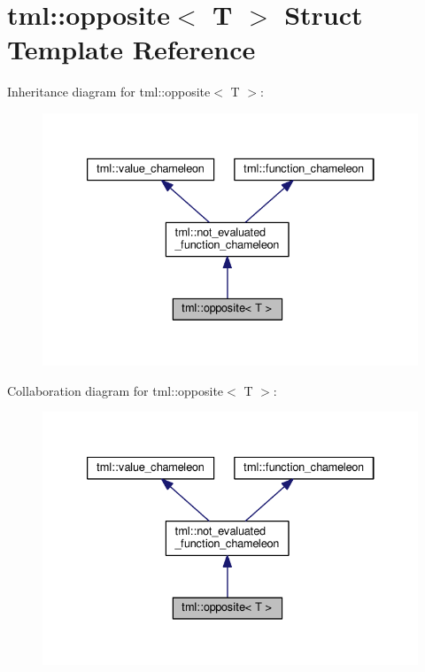 \hypertarget{structtml_1_1opposite}{\section{tml\+:\+:opposite$<$ T $>$ Struct Template Reference}
\label{structtml_1_1opposite}
}


Inheritance diagram for tml\+:\+:opposite$<$ T $>$\+:
\nopagebreak
\begin{figure}[H]
\begin{center}
\leavevmode
\includegraphics[width=333pt]{structtml_1_1opposite__inherit__graph}
\end{center}
\end{figure}


Collaboration diagram for tml\+:\+:opposite$<$ T $>$\+:
\nopagebreak
\begin{figure}[H]
\begin{center}
\leavevmode
\includegraphics[width=333pt]{structtml_1_1opposite__coll__graph}
\end{center}
\end{figure}
